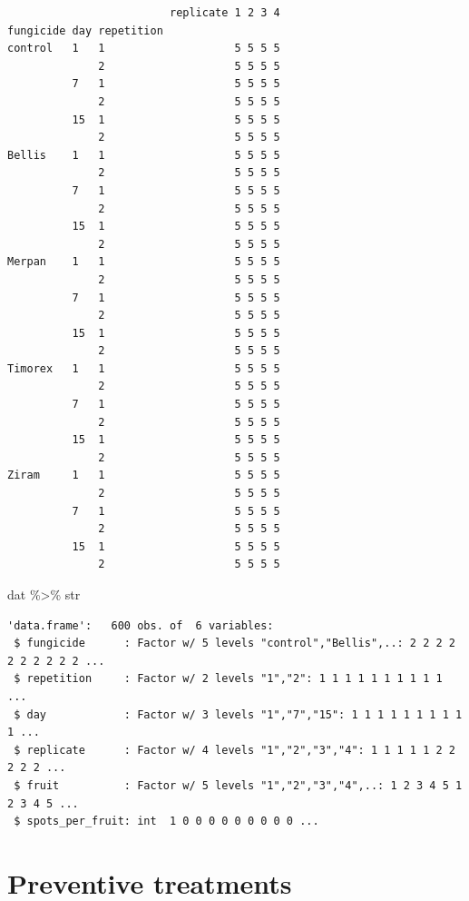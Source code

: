 \documentclass[
  letterpaper,
  DIV=11,
  numbers=noendperiod]{scrreport}
\newenvironment{Shaded}{\begin{snugshade}}{\end{snugshade}}
\newcommand{\NormalTok}[1]{\textcolor[rgb]{0.00,0.23,0.31}{#1}}
\newcommand{\SpecialCharTok}[1]{\textcolor[rgb]{0.37,0.37,0.37}{#1}}
\begin{document}
\begin{verbatim}
                         replicate 1 2 3 4
fungicide day repetition                  
control   1   1                    5 5 5 5
              2                    5 5 5 5
          7   1                    5 5 5 5
              2                    5 5 5 5
          15  1                    5 5 5 5
              2                    5 5 5 5
Bellis    1   1                    5 5 5 5
              2                    5 5 5 5
          7   1                    5 5 5 5
              2                    5 5 5 5
          15  1                    5 5 5 5
              2                    5 5 5 5
Merpan    1   1                    5 5 5 5
              2                    5 5 5 5
          7   1                    5 5 5 5
              2                    5 5 5 5
          15  1                    5 5 5 5
              2                    5 5 5 5
Timorex   1   1                    5 5 5 5
              2                    5 5 5 5
          7   1                    5 5 5 5
              2                    5 5 5 5
          15  1                    5 5 5 5
              2                    5 5 5 5
Ziram     1   1                    5 5 5 5
              2                    5 5 5 5
          7   1                    5 5 5 5
              2                    5 5 5 5
          15  1                    5 5 5 5
              2                    5 5 5 5
\end{verbatim}

\begin{Shaded}
\begin{Highlighting}[]
\NormalTok{dat }\SpecialCharTok{\%\textgreater{}\%}\NormalTok{ str}
\end{Highlighting}
\end{Shaded}

\begin{verbatim}
'data.frame':   600 obs. of  6 variables:
 $ fungicide      : Factor w/ 5 levels "control","Bellis",..: 2 2 2 2 2 2 2 2 2 2 ...
 $ repetition     : Factor w/ 2 levels "1","2": 1 1 1 1 1 1 1 1 1 1 ...
 $ day            : Factor w/ 3 levels "1","7","15": 1 1 1 1 1 1 1 1 1 1 ...
 $ replicate      : Factor w/ 4 levels "1","2","3","4": 1 1 1 1 1 2 2 2 2 2 ...
 $ fruit          : Factor w/ 5 levels "1","2","3","4",..: 1 2 3 4 5 1 2 3 4 5 ...
 $ spots_per_fruit: int  1 0 0 0 0 0 0 0 0 0 ...
\end{verbatim}

\hypertarget{preventive-treatments}{%
\section{Preventive treatments}\label{preventive-treatments}}
\end{document}
